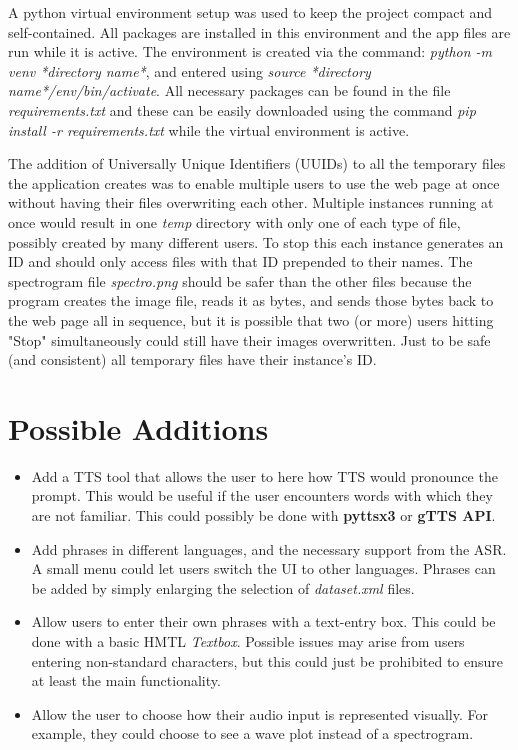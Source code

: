 \documentclass[12pt, letterpaper]{article}
\begin{document}
A python virtual environment setup was used to keep the project compact and self-contained. All packages are installed in this environment and the app files are run while it is active. The environment is created via the command: \textit{python -m venv *directory name*}, and entered using \textit{source *directory name*/env/bin/activate}. All necessary packages can be found in the file \textit{requirements.txt} and these can be easily downloaded using the command \textit{pip install -r requirements.txt} while the virtual environment is active.

The addition of Universally Unique Identifiers (UUIDs) to all the temporary files the application creates was to enable multiple users to use the web page at once without having their files overwriting each other. Multiple instances running at once would result in one \textit{temp} directory with only one of each type of file, possibly created by many different users. To stop this each instance generates an ID and should only access files with that ID prepended to their names. The spectrogram file \textit{spectro.png} should be safer than the other files because the program creates the image file, reads it as bytes, and sends those bytes back to the web page all in sequence, but it is possible that two (or more) users hitting "Stop" simultaneously could still have their images overwritten. Just to be safe  (and consistent) all temporary files have their instance's ID.

\section*{Possible Additions}
\begin{itemize}
\item{Add a TTS tool that allows the user to here how TTS would pronounce the prompt. This would be useful if the user encounters words with which they are not familiar. This could possibly be done with \textbf{pyttsx3} or \textbf{gTTS API}.}

\item{Add phrases in different languages, and the necessary support from the ASR. A small menu could let users switch the UI to other languages. Phrases can be added by simply enlarging the selection of \textit{dataset.xml} files.}

\item{Allow users to enter their own phrases with a text-entry box. This could be done with a basic HMTL \textit{Textbox}. Possible issues may arise from users entering non-standard characters, but this could just be prohibited to ensure at least the main functionality.}

\item{Allow the user to choose how their audio input is represented visually. For example, they could choose to see a wave plot instead of a spectrogram.}
\end{itemize}
\end{document}

